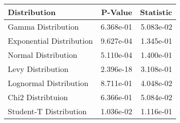 \begin{tabular}{l rr}
\toprule Distribution &  P-Value & Statistic\\
\midrule
Gamma Distribution & 6.368e-01 & 5.083e-02 \\
Exponential Distribution & 9.627e-04 & 1.345e-01 \\
Normal Distribution & 5.110e-04 & 1.400e-01 \\
Levy Distribution & 2.396e-18 & 3.108e-01 \\
Lognormal Distribution & 8.711e-01 & 4.048e-02 \\
Chi2 Distribtuion & 6.366e-01 & 5.084e-02 \\
Student-T Distribution & 1.036e-02 & 1.116e-01 \\
\bottomrule
\end{tabular}